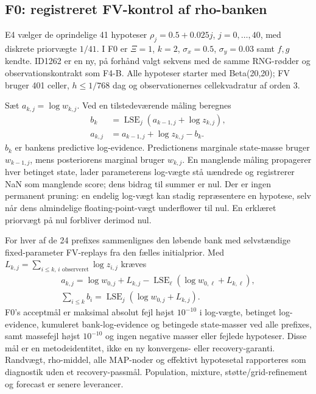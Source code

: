\subsection*{F0: registreret FV-kontrol af rho-banken}
E4 vælger de oprindelige 41 hypoteser \(\rho_j=0.5+0.025j\),
\(j=0,\ldots,40\), med diskrete priorvægte \(1/41\).
I F0 er \(\Xi=1\), \(k=2\), \(\sigma_x=0.5\),
\(\sigma_y=0.03\) samt \(f,g\) kendte. ID1262 er en ny, på forhånd valgt
sekvens med de samme RNG-rødder og observationskontrakt som F4-B.
Alle hypoteser starter med Beta(20,20); FV bruger 401 celler,
\(h\leq1/768\) dag og observationernes cellekvadratur af orden 3.

Sæt \(a_{k,j}=\log w_{k,j}\). Ved en tilstedeværende måling beregnes
\begin{align}
 b_k&=\operatorname{LSE}_j(a_{k-1,j}+\log z_{k,j}),\\
 a_{k,j}&=a_{k-1,j}+\log z_{k,j}-b_k.
 \label{eq:f0logweights}
\end{align}
\(b_k\) er bankens predictive log-evidence. Predictionens marginale state-masse
bruger \(w_{k-1,j}\), mens posteriorens marginal bruger \(w_{k,j}\).
En manglende måling propagerer hver betinget state, lader parameterens log-vægte
stå uændrede og registrerer NaN som manglende score; dens bidrag til summer er nul.
Der er ingen permanent pruning: en endelig log-vægt kan stadig repræsentere en
hypotese, selv når dens almindelige floating-point-vægt underflower til nul.
En erklæret priorvægt på nul forbliver derimod nul.

For hver af de 24 prefixes sammenlignes den løbende bank med selvstændige
fixed-parameter FV-replays fra den fælles initialprior. Med
\(L_{k,j}=\sum_{i\leq k,\,i\text{ observeret}}\log z_{i,j}\) kræves
\begin{align}
 a_{k,j}=\log w_{0,j}+L_{k,j}
 -\operatorname{LSE}_\ell(\log w_{0,\ell}+L_{k,\ell}),\nonumber\\
 \sum_{i\leq k}b_i=\operatorname{LSE}_j(\log w_{0,j}+L_{k,j}).
 \label{eq:f0identity}
\end{align}
F0's acceptmål er maksimal absolut fejl højst \(10^{-10}\) i log-vægte,
betinget log-evidence, kumuleret bank-log-evidence og betingede state-masser ved alle prefixes,
samt massefejl højst \(10^{-10}\) og ingen negative masser eller fejlede hypoteser.
Disse mål er en metodeidentitet, ikke en ny konvergens- eller recovery-garanti.
Randvægt, rho-middel, alle MAP-noder og effektivt hypotesetal rapporteres som
diagnostik uden et recovery-passmål. Population, mixture, støtte/grid-refinement
og forecast er senere leverancer.

